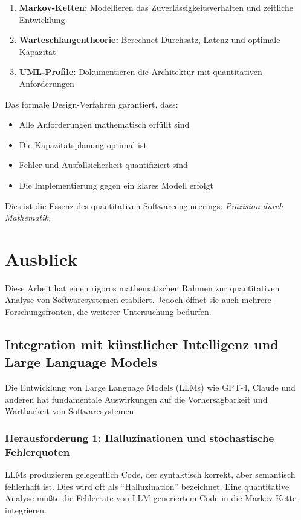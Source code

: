 \documentclass[a4paper,11pt]{article}
\theoremstyle{definition}
\begin{document}
\begin{enumerate}
    \item \textbf{Markov-Ketten:} Modellieren das Zuverlässigkeitsverhalten und zeitliche Entwicklung
    \item \textbf{Warteschlangentheorie:} Berechnet Durchsatz, Latenz und optimale Kapazität
    \item \textbf{UML-Profile:} Dokumentieren die Architektur mit quantitativen Anforderungen
\end{enumerate}

Das formale Design-Verfahren garantiert, dass:
\begin{itemize}
    \item Alle Anforderungen mathematisch erfüllt sind
    \item Die Kapazitätsplanung optimal ist
    \item Fehler und Ausfallsicherheit quantifiziert sind
    \item Die Implementierung gegen ein klares Modell erfolgt
\end{itemize}

Dies ist die Essenz des quantitativen Softwareengineerings: \emph{Präzision durch Mathematik.}


\section{Ausblick}

Diese Arbeit hat einen rigoros mathematischen Rahmen zur quantitativen Analyse von 
Softwaresystemen etabliert. Jedoch öffnet sie auch mehrere Forschungsfronten, die 
weiterer Untersuchung bedürfen.

\subsection{Integration mit künstlicher Intelligenz und Large Language Models}

Die Entwicklung von Large Language Models (LLMs) wie GPT-4, Claude und anderen hat 
fundamentale Auswirkungen auf die Vorhersagbarkeit und Wartbarkeit von Softwaresystemen.

\subsubsection{Herausforderung 1: Halluzinationen und stochastische Fehlerquoten}

LLMs produzieren gelegentlich Code, der syntaktisch korrekt, aber semantisch fehlerhaft ist. 
Dies wird oft als ``Halluzination'' bezeichnet. Eine quantitative Analyse müßte die Fehlerrate 
von LLM-generiertem Code in die Markov-Kette integrieren.
\end{document}
